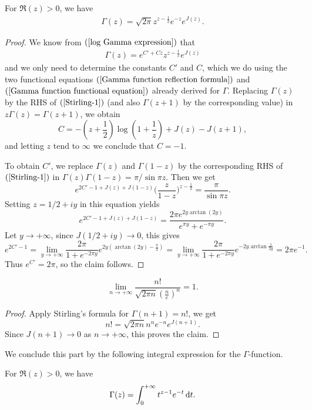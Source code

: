 \begin{theorem}
For $\Re(z)>0$, we have
\begin{align}\label{Stirling's formula}
\Gamma(z)=\sqrt{2\pi}z^{z-\frac{1}{2}}e^{-z}e^{J(z)}.
\end{align}
\end{theorem}
\begin{proof}
We know from $(\ref{log Gamma expression})$ that
\begin{align}\label{Stirling-1}
\Gamma(z)=e^{C'+Cz}z^{z-\frac{1}{2}}e^{J(z)}
\end{align}
and we only need to determine the constants $C'$ and $C$, which we do using the two functional equations $(\ref{Gamma function reflection formula})$ and $(\ref{Gamma function functional equation})$ already derived for $\Gamma$. Replacing $\Gamma(z)$ by the RHS of $(\ref{Stirling-1})$ (and also $\Gamma(z+1)$ by the corresponding value) in $z\Gamma(z)=\Gamma(z+1)$, we obtain
\[C=-(z+\frac{1}{2})\log(1+\frac{1}{z})+J(z)-J(z+1),\]
and letting $z$ tend to $\infty$ we conclude that $C=-1$.\par
To obtain $C'$, we replace $\Gamma(z)$ and $\Gamma(1-z)$ by the corresponding RHS of $(\ref{Stirling-1})$ in $\Gamma(z)\Gamma(1-z)=\pi/\sin\pi z$. Then we get
\[e^{2C'-1+J(z)+J(1-z)}\Big(\frac{z}{1-z}\Big)^{z-\frac{1}{2}}=\frac{\pi}{\sin\pi z}.\]
Setting $z=1/2+iy$ in this equation yields
\[e^{2C'-1+J(z)+J(1-z)}=\frac{2\pi e^{2y\arctan(2y)}}{e^{\pi y}+e^{-\pi y}}.\]
Let $y\to+\infty$, since $J(1/2+iy)\to 0$, this gives
\[e^{2C'-1}=\lim_{y\to+\infty}\frac{2\pi}{1+e^{-2\pi y}}e^{2y(\arctan(2y)-\frac{\pi}{2})}=\lim_{y\to+\infty}\frac{2\pi}{1+e^{-2\pi y}}e^{-2y\arctan\frac{1}{2y}}=2\pi e^{-1}.\]
Thus $e^{C'}=2\pi$, so the claim follows. 
\end{proof}
\begin{corollary}
\[\lim_{n\to+\infty}\frac{n!}{\sqrt{2\pi n}(\frac{n}{e})^n}=1.\]
\end{corollary}
\begin{proof}
Apply Stirling's formula for $\Gamma(n+1)=n!$, we get
\[n!=\sqrt{2\pi n}n^ne^{-n}e^{J(n+1)}.\]
Since $J(n+1)\to 0$ as $n\to+\infty$, this proves the claim.
\end{proof}
We conclude this part by the following integral expression for the $\Gamma$-function.
\begin{proposition}
For $\Re(z)>0$, we have
\begin{align}\label{Gamma function integral expression}
\Gamma(z)=\int_{0}^{+\infty}t^{z-1}e^{-t}\mathop{}\!\mathrm{d} t.
\end{align}
\end{proposition}
